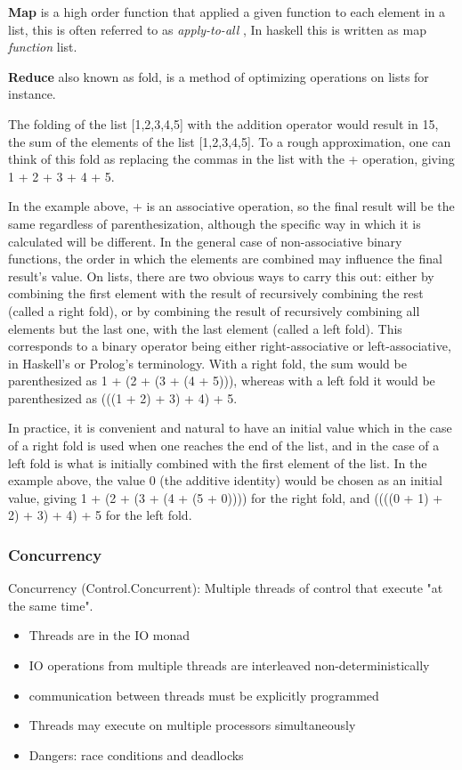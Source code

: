 \documentclass[a4paper,oneside]{report}
\begin{document}
			\textbf{Map} is a high order function that applied a given function to each element in a list, this is often referred to as \emph{apply-to-all} , In haskell this is written as map \emph{function} list.



			\textbf{Reduce} also known as fold, is a method of optimizing operations on lists for instance. 

			The folding of the list [1,2,3,4,5] with the addition operator would result in 15, the sum of the elements of the list [1,2,3,4,5]. To a rough approximation, one can think of this fold as replacing the commas in the list with the + operation, giving 1 + 2 + 3 + 4 + 5.

			In the example above, + is an associative operation, so the final result will be the same regardless of parenthesization, although the specific way in which it is calculated will be different. In the general case of non-associative binary functions, the order in which the elements are combined may influence the final result's value. On lists, there are two obvious ways to carry this out: either by combining the first element with the result of recursively combining the rest (called a right fold), or by combining the result of recursively combining all elements but the last one, with the last element (called a left fold). This corresponds to a binary operator being either right-associative or left-associative, in Haskell's or Prolog's terminology. With a right fold, the sum would be parenthesized as 1 + (2 + (3 + (4 + 5))), whereas with a left fold it would be parenthesized as (((1 + 2) + 3) + 4) + 5.

			 In practice, it is convenient and natural to have an initial value which in the case of a right fold is used when one reaches the end of the list, and in the case of a left fold is what is initially combined with the first element of the list. In the example above, the value 0 (the additive identity) would be chosen as an initial value, giving 1 + (2 + (3 + (4 + (5 + 0)))) for the right fold, and ((((0 + 1) + 2) + 3) + 4) + 5 for the left fold.
			


      		\subsubsection{Concurrency}
			Concurrency (Control.Concurrent): Multiple threads of control that execute "at the same time".

				\begin{itemize}
					\item Threads are in the IO monad
					\item IO operations from multiple threads are interleaved non-deterministically
					\item communication between threads must be explicitly programmed
					\item Threads may execute on multiple processors simultaneously
					\item Dangers: race conditions and deadlocks
				\end{itemize}
\end{document}
